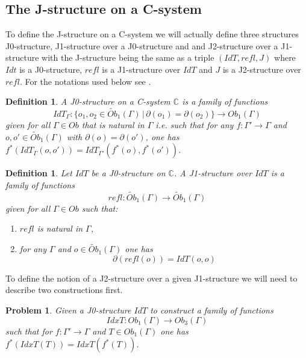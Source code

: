 \documentclass[12pt]{article}
\numberwithin{equation}{section}
\newenvironment{eq}{\begin{equation}}{\end{equation}}
\newtheorem{definition}[proposition]{Definition}
\newtheorem{problem}[proposition]{Problem}
\newcommand{\llabel}[1]{\label{#1}}
\newcommand{\sr}{\rightarrow}
\newcommand{\wt}{\widetilde}
\newcommand{\aCC}{{\mathbb C}}  %
\begin{document}
\subsection{The J-structure on a C-system}
%


To define the J-structure on a C-system we will actually define three
structures J0-structure, J1-structure over a J0-structure and and J2-structure
over a J1-structure with the J-structure being the same as a triple
$(IdT,refl,J)$ where $Idt$ is a J0-structure, $refl$ is a J1-structure over
$IdT$ and $J$ is a J2-structure over $refl$. For the notations used below see
\cite{fromunivwithPi}.
%
\begin{definition}
\llabel{2015.03.27.def1}
A J0-structure on a C-system $\aCC$ is a family of functions 
%
$$IdT_{\Gamma}:\{o_1,o_2\in \wt{Ob}_1(\Gamma)\,|\,\partial(o_1)=\partial(o_2)\}\sr Ob_1(\Gamma)$$
%
given for all $\Gamma\in Ob$ that is natural in $\Gamma$ i.e. such that for any
$f:\Gamma'\sr \Gamma$ and $o,o'\in \wt{Ob}_1(\Gamma)$ with
$\partial(o)=\partial(o')$, one has
$f^*(IdT_{\Gamma}(o,o'))=IdT_{\Gamma'}(f^*(o),f^*(o'))$.
\end{definition}
%
\begin{definition}
\llabel{2015.03.27.def2}
Let $IdT$ be a J0-structure on $\aCC$. A J1-structure over $IdT$ is a family of
functions
%
$$refl:\wt{Ob}_1(\Gamma)\sr \wt{Ob}_1(\Gamma)$$
%
given for all $\Gamma\in Ob$ such that:
%
\begin{enumerate}
\item $refl$ is natural in $\Gamma$,
\item for any $\Gamma$ and $o\in \wt{Ob}_1(\Gamma)$ one has 
%
\begin{eq}
\llabel{2015.03.27.eq8}
\partial(refl(o))=IdT(o,o)
\end{eq}
\end{enumerate}
\end{definition}
%
To define the notion of a J2-structure over a given J1-structure we will need
to describe two constructions first.
%
\begin{problem}
\llabel{2015.03.27.prob1} Given a J0-structure $IdT$ to construct a family of
functions
%
$$IdxT:Ob_1(\Gamma)\sr Ob_3(\Gamma)$$
%
such that for $f:\Gamma'\sr \Gamma$ and $T\in Ob_1(\Gamma)$ one has
$f^*(IdxT(T))=IdxT(f^*(T))$.
\end{problem}
%
\end{document}
